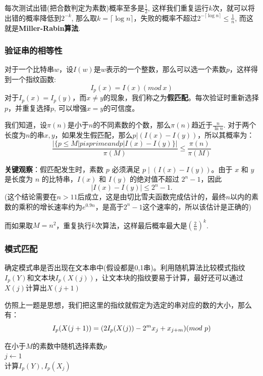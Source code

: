 \documentclass[./../main.tex]{subfiles} %
\begin{document}
每次测试出错(把合数判定为素数)概率至多是$\frac{1}{2}$, 这样我们重复运行$k$次，就可以将出错的概率降低到$2^{-k}$, 那么取$k=\lceil \log n\rceil$，失败的概率不超过$2^{-\lceil \log n\rceil}\le \frac{1}{n}$, 而这就是\textbf{Miller-Rabin算法}.


\subsubsection{验证串的相等性}
对于一个比特串$w$，设$I(w)$是$w$表示的一个整数，那么可以选一个素数$p$，这样得到一个指纹函数:
$$
I_p(x)=I(x)(mod~x)
$$
对于$I_p(x)=I_p(y)$，而$x\neq y$的现象，我们称之为\textbf{假匹配}。每次验证时重新选择$p$，并重复选择$p$, 可以增强$x=y$的可信度。

我们知道，设$\pi(n)$是小于$n$的不同素数的个数，那么$\pi(n)$趋近于$\frac{n}{\ln n}$.
对于两个长度为$n$的串$x,y$，如果发生假匹配，那么$p|(I(x)-I(y))$，所以其概率为：
$$
\frac{|\{p\le M|p is prime and p | I(x)-I(y)\}|}{\pi(M)}\le\frac{\pi(n)}{\pi(M)}
$$

\noindent \textbf{关键观察}：假匹配发生时，素数 $p$ 必须满足 $p \mid (I(x) - I(y))$。由于 $x$ 和 $y$ 是长度为 $n$ 的比特串，$I(x)$ 和 $I(y)$ 的绝对值不超过 $2^n - 1$，因此
$$
|I(x) - I(y)| \leq 2^n - 1.
$$
(这个结论需要在$n>11$后成立，这是由切比雪夫函数完成估计的，最终$n$以内的素数的乘积的增长速率约为$e^{0.9n}$，是高于$2^n-1$这个速率的，所以该估计是正确的)

而如果取$M=n^2$，重复执行$k$次算法，这样最后概率最大是$(\frac{2}{n})^k$.

\subsubsection{模式匹配}
确定模式串是否出现在文本串中(假设都是0,1串)。利用随机算法比较模式指纹$I_p(Y)$和文本块$I_p(X(j))$，让文本块的指纹要易于计算，最好还可以通过$X(j)$计算出$X(j+1)$

仿照上一题是思想，我们把这里的指纹就假定为选定的串对应的数的大小，那么有：
$$
I_p(X(j+1))=(2I_p(X(j)) -2^mx_j+x_{j+m})(mod~p)\\
$$

\begin{algorithm}[h]
    \BlankLine

    在小于$M$的素数中随机选择素数$p$\\
    $j\leftarrow1$\\
    计算$I_p(Y), I_p(X_j)$\\
    \caption{Rabin-Karp算法}
\end{algorithm}
\end{document}
